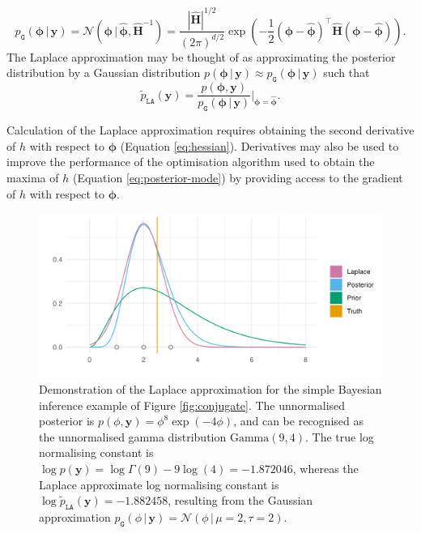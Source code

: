 \documentclass[a4paper, nobind]{templates/ociamthesis}
\begin{document}
\begin{equation}
p_\texttt{G}(\boldsymbol{\mathbf{\phi}} \, | \, \mathbf{y}) = \mathcal{N}(\boldsymbol{\mathbf{\phi}} \, | \, \hat{\boldsymbol{\mathbf{\phi}}}, \hat {\mathbf{H}}^{-1}) = \frac{| \hat {\mathbf{H}} |^{1/2}}{(2 \pi)^{d/2}} \exp \left( - \frac{1}{2} (\boldsymbol{\mathbf{\phi}} - \hat{\boldsymbol{\mathbf{\phi}}})^\top \hat {\mathbf{H}} (\boldsymbol{\mathbf{\phi}} - \hat{\boldsymbol{\mathbf{\phi}}}) \right).
\end{equation}
The Laplace approximation may be thought of as approximating the posterior distribution by a Gaussian distribution \(p(\boldsymbol{\mathbf{\phi}} \, | \, \mathbf{y}) \approx p_\texttt{G}(\boldsymbol{\mathbf{\phi}} \, | \, \mathbf{y})\) such that
\begin{equation}
\tilde p_{\texttt{LA}}(\mathbf{y}) = \frac{p(\boldsymbol{\mathbf{\phi}}, \mathbf{y})}{p_\texttt{G}(\boldsymbol{\mathbf{\phi}} \, | \, \mathbf{y})} \Big\rvert_{\boldsymbol{\mathbf{\phi}} = \hat{\boldsymbol{\mathbf{\phi}}}}.
\end{equation}

Calculation of the Laplace approximation requires obtaining the second derivative of \(h\) with respect to \(\boldsymbol{\mathbf{\phi}}\) (Equation \eqref{eq:hessian}).
Derivatives may also be used to improve the performance of the optimisation algorithm used to obtain the maxima of \(h\) (Equation \eqref{eq:posterior-mode}) by providing access to the gradient of \(h\) with respect to \(\boldsymbol{\mathbf{\phi}}\).



\begin{figure}
\includegraphics[width=0.95\linewidth]{figures/naomi-aghq/laplace} \caption{Demonstration of the Laplace approximation for the simple Bayesian inference example of Figure \ref{fig:conjugate}. The unnormalised posterior is \(p(\phi, \mathbf{y}) = \phi^8 \exp(-4 \phi)\), and can be recognised as the unnormalised gamma distribution \(\text{Gamma}(9, 4)\). The true log normalising constant is \(\log p(\mathbf{y}) = \log\Gamma(9) - 9 \log(4) = -1.872046\), whereas the Laplace approximate log normalising constant is \(\log \tilde p_{\texttt{LA}}(\mathbf{y}) = -1.882458\), resulting from the Gaussian approximation \(p_\texttt{G}(\phi \, | \, \mathbf{y}) = \mathcal{N}(\phi \, | \,\mu = 2, \tau = 2)\).}\label{fig:laplace}
\end{figure}
\end{document}
